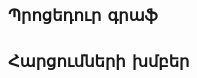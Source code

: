 {
    \subsubsection{Պրոցեդուր գրաֆ}\label{subsubsec:proceduregraph}
    

    \subsubsection{Հարցումների խմբեր}\label{subsubsec:queryGroups}
    
}